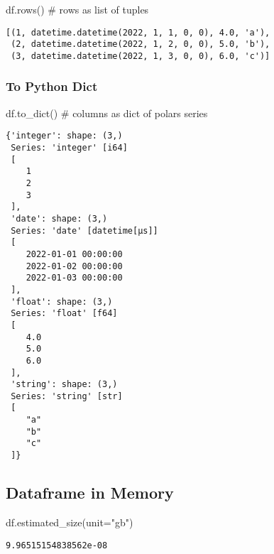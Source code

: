 \documentclass[
  letterpaper,
  DIV=11,
  numbers=noendperiod]{scrartcl}
\newenvironment{Shaded}{\begin{snugshade}}{\end{snugshade}}
\newcommand{\CommentTok}[1]{\textcolor[rgb]{0.37,0.37,0.37}{#1}}
\newcommand{\NormalTok}[1]{\textcolor[rgb]{0.00,0.23,0.31}{#1}}
\newcommand{\OperatorTok}[1]{\textcolor[rgb]{0.37,0.37,0.37}{#1}}
\newcommand{\StringTok}[1]{\textcolor[rgb]{0.13,0.47,0.30}{#1}}
\begin{document}
\begin{Shaded}
\begin{Highlighting}[]
\NormalTok{df.rows() }\CommentTok{\# rows as list of tuples}
\end{Highlighting}
\end{Shaded}

\begin{verbatim}
[(1, datetime.datetime(2022, 1, 1, 0, 0), 4.0, 'a'),
 (2, datetime.datetime(2022, 1, 2, 0, 0), 5.0, 'b'),
 (3, datetime.datetime(2022, 1, 3, 0, 0), 6.0, 'c')]
\end{verbatim}

\hypertarget{to-python-dict}{%
\subsubsection{To Python Dict}\label{to-python-dict}}

\begin{Shaded}
\begin{Highlighting}[]
\NormalTok{df.to\_dict() }\CommentTok{\# columns as dict of polars series}
\end{Highlighting}
\end{Shaded}

\begin{verbatim}
{'integer': shape: (3,)
 Series: 'integer' [i64]
 [
    1
    2
    3
 ],
 'date': shape: (3,)
 Series: 'date' [datetime[μs]]
 [
    2022-01-01 00:00:00
    2022-01-02 00:00:00
    2022-01-03 00:00:00
 ],
 'float': shape: (3,)
 Series: 'float' [f64]
 [
    4.0
    5.0
    6.0
 ],
 'string': shape: (3,)
 Series: 'string' [str]
 [
    "a"
    "b"
    "c"
 ]}
\end{verbatim}

\hypertarget{dataframe-in-memory}{%
\subsection{Dataframe in Memory}\label{dataframe-in-memory}}

\begin{Shaded}
\begin{Highlighting}[]
\NormalTok{df.estimated\_size(unit}\OperatorTok{=}\StringTok{"gb"}\NormalTok{)}
\end{Highlighting}
\end{Shaded}

\begin{verbatim}
9.96515154838562e-08
\end{verbatim}
\end{document}
